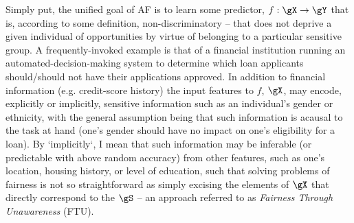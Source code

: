 %
Simply put, the unified goal of \ac{AF} is to learn some predictor, \(f: \gX \to \gY \) that is,
according to some definition, non-discriminatory -- that does not deprive a given individual of
opportunities by virtue of belonging to a particular sensitive group.
%
A frequently-invoked example is that of a financial institution running an
automated-decision-making system to determine which loan applicants should/should not have their
applications approved.
%
In addition to financial information (e.g. credit-score history) the input features to \(f\),
\(\gX\), may encode, explicitly or implicitly, sensitive information such as an individual's gender
or ethnicity, with the general assumption being that such information is acausal to the task at
hand (one's gender should have no impact on one's eligibility for a loan).
%
By `implicitly`, I mean that such information may be inferable (or predictable with above random
accuracy) from other features, such as one's location, housing history, or level of education, such
that solving problems of fairness is not so straightforward as simply excising the elements of
\(\gX\) that directly correspond to the \(\gS\) -- an approach referred to as \emph{Fairness
Through Unawareness} (FTU).
%

